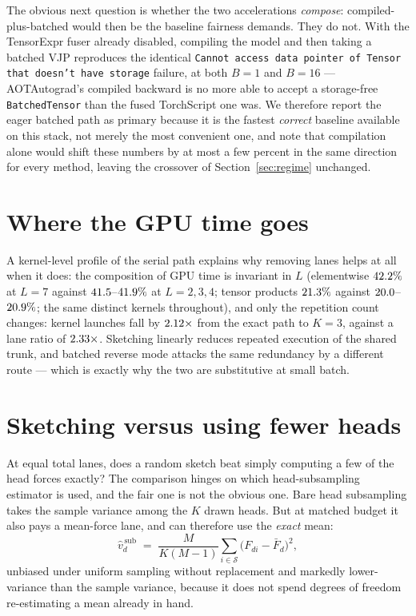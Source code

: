 \documentclass{article}
\begin{document}
The obvious next question is whether the two accelerations \emph{compose}: compiled-plus-batched
would then be the baseline fairness demands. They do not. With the TensorExpr fuser already disabled,
compiling the model and then taking a batched VJP reproduces the identical
\texttt{Cannot access data pointer of Tensor that doesn't have storage} failure, at both $B{=}1$ and
$B{=}16$ --- AOTAutograd's compiled backward is no more able to accept a storage-free
\texttt{BatchedTensor} than the fused TorchScript one was. We therefore report the eager batched
path as primary because it is the fastest \emph{correct} baseline available on this stack, not
merely the most convenient one, and note that compilation alone would shift these numbers by at most
a few percent in the same direction for every method, leaving the crossover of
Section~\ref{sec:regime} unchanged.

\section{Where the GPU time goes}
\label{app:kernels}
A kernel-level profile of the serial path explains why removing lanes helps at all when it does: the
composition of GPU time is invariant in $L$ (elementwise $42.2\%$ at $L{=}7$ against
$41.5$--$41.9\%$ at $L{=}2,3,4$; tensor products
$21.3\%$ against $20.0$--$20.9\%$; the same \fsKernDistinct{}
distinct kernels throughout), and only the repetition count changes: kernel launches fall by
$2.12\times$ from the exact path to $K{=}3$, against a lane ratio of
$2.33\times$. Sketching linearly reduces repeated execution of the shared trunk, and
batched reverse mode attacks the same redundancy by a different route --- which is exactly why the
two are substitutive at small batch.

\section{Sketching versus using fewer heads}
\label{app:headsub}
At equal total lanes, does a random sketch beat simply computing a few of the head forces exactly?
The comparison hinges on which head-subsampling estimator is used, and the fair one is not the
obvious one. Bare head subsampling takes the sample variance among the $K$ drawn heads. But at
matched budget it also pays a mean-force lane, and can therefore use the \emph{exact} mean:
\begin{equation*}
\widehat v^{\,\text{sub}}_d \;=\; \frac{M}{K(M-1)}\sum_{i\in\mathcal S}\bigl(F_{di}-\bar F_d\bigr)^2 ,
\end{equation*}
unbiased under uniform sampling without replacement and markedly lower-variance than the sample
variance, because it does not spend degrees of freedom re-estimating a mean already in hand.
\end{document}
